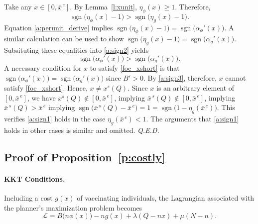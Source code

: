 \documentclass[12pt]{article}
\DeclareMathOperator*{\sgn}{sgn}
\renewcommand{\qed}{{\it Q.E.D.}}
\newcommand{\efficacy}{\phi}
\newcommand{\general}{g}
\newcommand{\benefit}{B}
\newcommand{\xshort}{x^{s}}
\newcommand{\xshortbar}{\bar{x}^{\,s}}
\newcommand{\xunitbar}{\bar{x}^{\,e}}
\newcommand{\Lagrangian}{\mathscr{L}}
\newcommand{\elasticity}[1]{\eta_{#1}}
\newcommand{\perunit}[1]{\alpha_{#1}}
\begin{document}
Take any $x \in [0, \xunitbar]$. By Lemma~\ref{l:xunit},
$\elasticity{\efficacy}\!(x) \geq 1$. Therefore,
\begin{equation}
\label{a:sign2}
\sgn \bigl( \elasticity{\efficacy}\! (x) - 1 \bigr) > \sgn \bigl(
\elasticity{\general}\! (x) - 1 \bigr).
\end{equation}
Equation \eqref{a:perunit_derive} implies $\sgn
\bigl(\elasticity{\efficacy}\! (x) - 1 \bigr) = \sgn \bigl(
\perunit{\efficacy}'\!(x) \bigr)$. A similar calculation can be used
to show $\sgn \bigl(\elasticity{\general}\! (x) - 1 \bigr) = \sgn
\bigl( \perunit{\general}'\!(x) \bigr)$. Subsituting these equalities
into \eqref{a:sign2} yields
\begin{equation}
\label{a:sign3}
\sgn \bigl(\perunit{\efficacy}'\!(x) \bigr) > \sgn \bigl(
\perunit{\general}'\!(x) \bigr).
\end{equation}
A necessary condition for $x$ to satisfy \eqref{foc_xshort} is that
$\sgn \bigl(\perunit{\efficacy}'\!(x) \bigr) = \sgn \bigl(
\perunit{\general}'\!(x) \bigr)$ since $\benefit' > 0$. By
\eqref{a:sign3}, therefore, $x$ cannot satisfy
\eqref{foc_xshort}. Hence, $x \neq \xshort\!(Q)$. Since $x$ is an
arbitrary element of $[0, \xunitbar]$, we have $\xshort\!(Q) \not\in
[0, \xunitbar]$, implying $\xshortbar\!(Q) \not\in [0, \xunitbar]$,
implying $\xshortbar\!(Q) > \xunitbar$ implying $\sgn \bigl(
\xshortbar\!(Q) - \xunitbar \bigr) = 1 = \sgn \bigl( 1 -
\elasticity{\general}\!(\xunitbar) \bigr)$. This verifies
\eqref{a:sign1} holds in the case $\elasticity{\general}\!(\xunitbar)
< 1$. The arguments that \eqref{a:sign1} holds in other cases is
similar and omitted. \qed


\subsection*{Proof of Proposition~\ref{p:costly}}

\paragraph{KKT Conditions.}

Including a cost $\general(x)$ of vaccinating individuals, the
Lagrangian associated with the planner's maximization problem becomes
\begin{equation}
\label{a:Lagrangian_costly}
\Lagrangian = \benefit \bigl( n \efficacy(x) \bigr) - n\general(x) +
\lambda(Q - nx) + \mu(N - n).
\end{equation}
\end{document}
